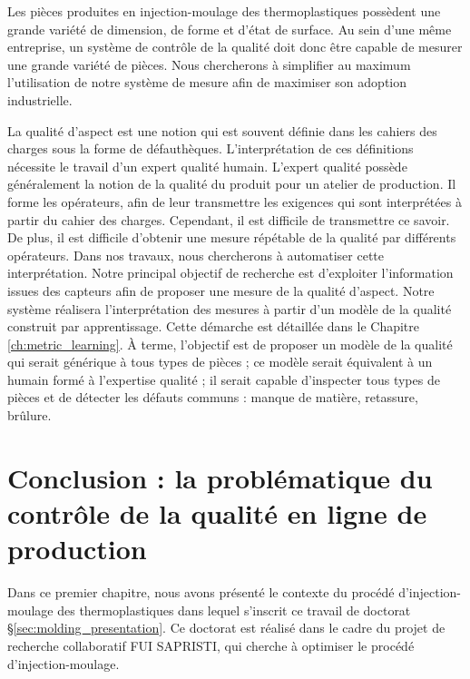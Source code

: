Les pièces produites en injection-moulage des thermoplastiques possèdent une grande variété de dimension, de forme et d'état de surface.
Au sein d'une même entreprise, un système de contrôle de la qualité doit donc être capable de mesurer une grande variété de pièces.
Nous chercherons à simplifier au maximum l'utilisation de notre système de mesure afin de maximiser son adoption industrielle.   %

La qualité d'aspect est une notion qui est souvent définie dans les cahiers des charges sous la forme de défauthèques.
L'interprétation de ces définitions nécessite le travail d'un expert qualité humain.
L'expert qualité possède généralement la notion de la qualité du produit pour un atelier de production.
Il forme les opérateurs, afin de leur transmettre les exigences qui sont interprétées à partir du cahier des charges.
Cependant, il est difficile de transmettre ce savoir.
De plus, il est difficile d'obtenir une mesure répétable de la qualité par différents opérateurs.
Dans nos travaux, nous chercherons à automatiser cette interprétation.
Notre principal objectif de recherche est d'exploiter l'information issues des capteurs afin de proposer une mesure de la qualité d'aspect.
Notre système réalisera l'interprétation des mesures à partir d'un modèle de la qualité construit par apprentissage.
Cette démarche est détaillée dans le Chapitre \ref{ch:metric_learning}.
À terme, l'objectif est de proposer un modèle de la qualité qui serait générique à tous types de pièces ;
ce modèle serait équivalent à un humain formé à l'expertise qualité ; il serait capable d'inspecter tous types de pièces et de détecter les défauts communs : manque de matière, retassure, brûlure.


\section{Conclusion : la problématique du contrôle de la qualité en ligne de production}
Dans ce premier chapitre, nous avons présenté le contexte du procédé d'injection-moulage des thermoplastiques dans lequel s’inscrit ce travail de doctorat §\ref{sec:molding_presentation}.
Ce doctorat est réalisé dans le cadre du projet de recherche collaboratif FUI SAPRISTI, qui cherche à optimiser le procédé d'injection-moulage.

